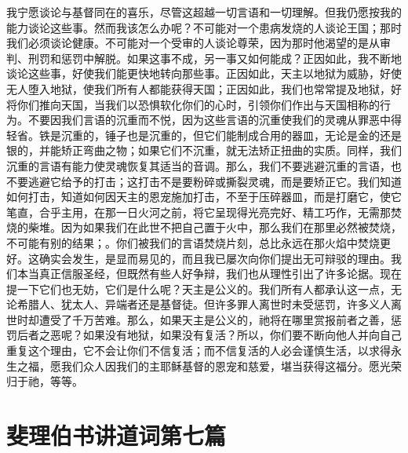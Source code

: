 我宁愿谈论与基督同在的喜乐，尽管这超越一切言语和一切理解。但我仍愿按我的能力谈论这些事。然而我该怎么办呢？不可能对一个患病发烧的人谈论王国；那时我们必须谈论健康。不可能对一个受审的人谈论尊荣，因为那时他渴望的是从审判、刑罚和惩罚中解脱。如果这事不成，另一事又如何能成？正因如此，我不断地谈论这些事，好使我们能更快地转向那些事。正因如此，天主以地狱为威胁，好使无人堕入地狱，使我们所有人都能获得天国；正因如此，我们也常常提及地狱，好将你们推向天国，当我们以恐惧软化你们的心时，引领你们作出与天国相称的行为。不要因我们言语的沉重而不悦，因为这些言语的沉重使我们的灵魂从罪恶中得轻省。铁是沉重的，锤子也是沉重的，但它们能制成合用的器皿，无论是金的还是银的，并能矫正弯曲之物；如果它们不沉重，就无法矫正扭曲的实质。同样，我们沉重的言语有能力使灵魂恢复其适当的音调。那么，我们不要逃避沉重的言语，也不要逃避它给予的打击；这打击不是要粉碎或撕裂灵魂，而是要矫正它。我们知道如何打击，知道如何因天主的恩宠施加打击，不至于压碎器皿，而是打磨它，使它笔直，合乎主用，在那一日火河之前，将它呈现得光亮完好、精工巧作，无需那焚烧的柴堆。因为如果我们在此世不把自己置于火中，那么我们在那里必然被焚烧，不可能有别的结果；。你们被我们的言语焚烧片刻，总比永远在那火焰中焚烧更好。这确实会发生，是显而易见的，而且我已屡次向你们提出无可辩驳的理由。我们本当真正信服圣经，但既然有些人好争辩，我们也从理性引出了许多论据。现在提一下它们也无妨，它们是什么呢？天主是公义的。我们所有人都承认这一点，无论希腊人、犹太人、异端者还是基督徒。但许多罪人离世时未受惩罚，许多义人离世时却遭受了千万苦难。那么，如果天主是公义的，祂将在哪里赏报前者之善，惩罚后者之恶呢？如果没有地狱，如果没有复活？所以，你们要不断向他人并向自己重复这个理由，它不会让你们不信复活；而不信复活的人必会谨慎生活，以求得永生之福，愿我们众人因我们的主耶稣基督的恩宠和慈爱，堪当获得这福分。愿光荣归于祂，等等。\par



\section{斐理伯书讲道词第七篇}

\par

\par

